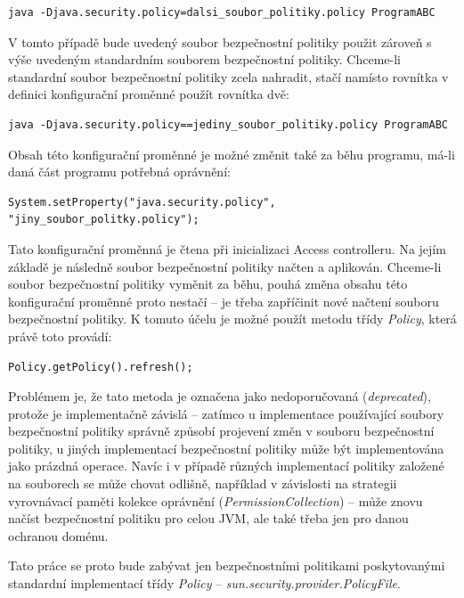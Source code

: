 \begin{verbatim}
java -Djava.security.policy=dalsi_soubor_politiky.policy ProgramABC
\end{verbatim}

V tomto případě bude uvedený soubor bezpečnostní politiky použit zároveň s výše uvedeným standardním souborem bezpečnostní politiky. Chceme-li standardní soubor bezpečnostní politiky zcela nahradit, stačí namísto rovnítka v definici konfigurační proměnné použít rovnítka dvě: \cite[5.3.1]{oaks}

\begin{verbatim}
java -Djava.security.policy==jediny_soubor_politiky.policy ProgramABC
\end{verbatim}

Obsah této konfigurační proměnné je možné změnit také za běhu programu, má-li daná část programu potřebná oprávnění:

\begin{verbatim}
System.setProperty("java.security.policy", "jiny_soubor_politky.policy");
\end{verbatim}

Tato konfigurační proměnná je čtena při inicializaci Access controlleru. Na jejím základě je následně soubor bezpečnostní politiky načten a aplikován. Chceme-li soubor bezpečnostní politiky vyměnit za běhu, pouhá změna obsahu této konfigurační proměnné proto nestačí -- je třeba zapříčinit nové načtení souboru bezpečnostní politiky. K tomuto účelu je možné použít metodu třídy {\it Policy}, která právě toto provádí:

\begin{verbatim}
Policy.getPolicy().refresh();
\end{verbatim}

Problémem je, že tato metoda je označena jako nedoporučovaná ({\it deprecated}), protože je implementačně závislá -- zatímco u implementace používající soubory bezpečnostní politiky správně způsobí projevení změn v souboru bezpečnostní politiky, u jiných implementací bezpečnostní politiky může být implementována jako prázdná operace. Navíc i v případě různých implementací politiky založené na souborech se může chovat odlišně, například v závislosti na strategii vyrovnávací paměti kolekce oprávnění ({\it PermissionCollection}) -- může znovu načíst bezpečnostní politiku pro celou JVM, ale také třeba jen pro danou ochranou doménu. \cite{refPolicy}

Tato práce se proto bude zabývat jen bezpečnostními politikami poskytovanými standardní implementací třídy {\it Policy} -- {\it sun.security.provider.PolicyFile}.

